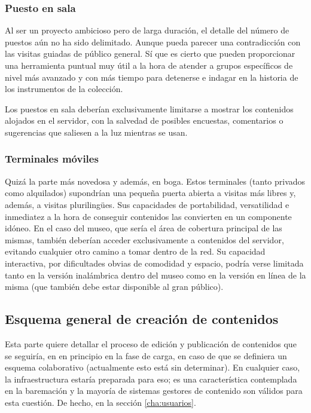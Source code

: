 \subsubsection{Puesto en sala}
\par Al ser un proyecto ambicioso pero de larga duración, el detalle del número de puestos aún no ha sido delimitado. Aunque pueda parecer una contradicción con las visitas guiadas de público general. Sí que es cierto que pueden proporcionar una herramienta puntual muy útil a la hora de atender a grupos específicos de nivel más avanzado y con más tiempo para detenerse e indagar en la historia de los instrumentos de la colección.
\par Los puestos en sala deberían exclusivamente limitarse a mostrar los contenidos alojados en el servidor, con la salvedad de posibles encuestas, comentarios o sugerencias que saliesen a la luz mientras se usan.

\subsubsection{Terminales móviles}
\par Quizá la parte más novedosa y además, en boga. Estos terminales (tanto privados como alquilados) supondrían una pequeña puerta abierta a visitas más libres y, además, a visitas plurilingües. Sus capacidades de portabilidad, versatilidad e inmediatez a la hora de conseguir contenidos las convierten en un componente idóneo. En el caso del museo, que sería el área de cobertura principal de las mismas, también deberían acceder exclusivamente a contenidos del servidor, evitando cualquier otro camino a tomar dentro de la red. Su capacidad interactiva, por dificultades obvias de comodidad y espacio, podría verse limitada tanto en la versión inalámbrica dentro del museo como en la versión en línea de la misma (que también debe estar disponible al gran público).


\subsection{Esquema general de creación de contenidos}
\par Esta parte quiere detallar el proceso de edición y publicación de contenidos que se seguiría, en en principio en la fase de carga, en caso de que se definiera un esquema colaborativo (actualmente esto está sin determinar). En cualquier caso, la infraestructura estaría preparada para eso; es una característica contemplada en la baremación y la mayoría de sistemas gestores de contenido son válidos para esta cuestión. De hecho, en la sección \ref{cha:usuarios}.

